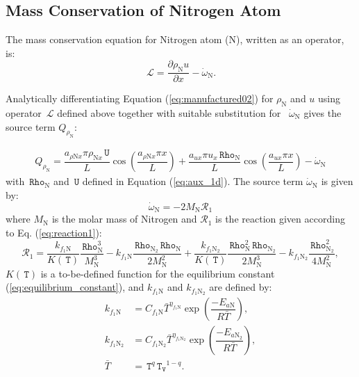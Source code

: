 \documentclass[10pt]{article}
\newcommand{\diff}[2] {\dfrac{\partial #1 }{\partial #2}}
\newcommand{\Lo}{\,\mathcal{L}}
\newcommand{\Rho}{\,\mathtt{Rho}}
\newcommand{\T}{\,\mathtt{T}}
\newcommand{\U}{\,\mathtt{U}}
\newcommand{\TV}{\,\mathtt{T_V}}
\newcommand{\N}{\text{N}}
\begin{document}



\subsection{Mass Conservation of Nitrogen Atom}

The mass conservation equation for Nitrogen atom (N), written as an operator, is:
\begin{equation*}
 \label{eq:euler1d_11}
\Lo =  \diff{\rho_\text{N} u}{x} - \dot{\omega}_{\text{N}}.
\end{equation*}

Analytically differentiating Equation (\ref{eq:manufactured02}) for $\rho_{\text{N}}$  and $u$ using operator $\Lo$ defined above together with suitable substitution for ~$\dot{\omega}_\text{N}$ gives the source term $Q_{\rho_{\text{N}}}$:



\begin{equation}
\begin{split}
Q_{\rho_\N} = \dfrac{a_{  \rho \N x } \pi \rho_{\N x} \U }{L}\cos\left(\dfrac{a_{  \rho \N x } \pi x}{L}\right) +\dfrac{a_{ux} \pi u_x \Rho_{\N}}{L} \cos\left(\dfrac{a_{ux} \pi x}{L}\right) -\dot{\omega}_\N
\end{split}
\end{equation}
%
with $\Rho_\N$ and $\U$ defined in Equation (\ref{eq:aux_1d}). The source term $\dot{\omega}_\N$ is given by:
$$
\dot{\omega}_\N = -2 M_\N \mathcal{R}_1	
$$
where $M_{\text{N}}$ is the molar mass of Nitrogen and $\mathcal{R}_1$ is the reaction given according to Eq. (\ref{eq:reaction1}):
\begin{equation}\label{eq:reaction3}
\mathcal{R}_1= \dfrac{k_{f_1 \N}}{K(\T)} \dfrac{\Rho_{\N}^3}{M_\N^3} - k_{f_1 \N}   \dfrac{\Rho_{\N_2} \Rho_{\N}}{2  M_\N^2}+
\dfrac{k_{f_1 \N_2}}{K(\T)} \dfrac{\Rho_\N^2 \Rho_{\N_2}}{2M_\N^3 }- k_{f_1 \N_2} \dfrac{\Rho_{\N_2}^2}{4 M_\N^2},
\end{equation}
$K(\T)$ is a to-be-defined function for the equilibrium constant (\ref{eq:equilibrium_constant}), and $k_{f_1 \text{N}}$ and $k_{f_1 \text{N}_2}$ are defined by:
\begin{equation}
 \begin{split}\label{eq:forward_rates}
k_{f_1 \text{N}} &= C_{f_1 \text{N}} \bar{T}^{\eta_{f_1 \text{N}}} \exp\left(\dfrac{-E_{a\text{N}}}{R \bar{T}}\right),\\
k_{f_1 \text{N}_2} &= C_{f_1 \text{N}_2} \bar{T}^{\eta_{f_1 \text{N}_2}} \exp\left(\dfrac{-E_{a\text{N}_2}}{R \bar{T}}\right),\\
\bar{T}&=\T^q \TV^{1-q}.
 \end{split}
\end{equation}
\end{document}
